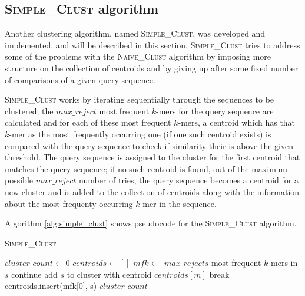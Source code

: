 

\subsection{\textsc{Simple\_Clust} algorithm}

Another clustering algorithm, named \textsc{Simple\_Clust}, was developed and
implemented, and will be described in this section. \textsc{Simple\_Clust}
tries to address some of the problems with the \textsc{Naive\_Clust} algorithm
by imposing more structure on the collection of centroids and by giving up
after some fixed number of comparisons of a given query sequence.


\textsc{Simple\_Clust} works by iterating sequentially through the sequences to
be clustered; the $max\_reject$ most frequent $k$-mers for the query sequence
are calculated and for each of these most frequent $k$-mers, a centroid which
has that $k$-mer as the most frequently occurring one (if one such centroid
exists) is compared with the query sequence to check if similarity their is
above the given threshold. The query sequence is assigned to the cluster for
the first centroid that matches the query sequence; if no such centroid is
found, out of the maximum possible $max\_reject$ number of tries, the query
sequence becomes a centroid for a new cluster and is added to the collection of
centroids along with the information about the most frequenty occurring $k$-mer
in the sequence.  %


Algorithm \ref{alg:simple_clust} shows pseudocode for the
\textsc{Simple\_Clust} algorithm.

\begin{algorithm}
  \caption{\textsc{Simple\_Clust}}
  \label{alg:simple_clust}
  \begin{algorithmic}[1]
    \Statex
      \State $cluster\_count \gets 0$
      \State $centroids \gets []$ 
        \State $mfk \gets$ $max\_rejects$ most frequent $k$-mers in $s$
            \State continue
            \State add $s$ to cluster with centroid $centroids[m]$
            \State break
          \EndIf
        \EndFor
          \State centroids.insert(mfk[0], s)
        \EndIf
      \EndFor
      \State \Return $cluster\_count$
    \EndFunction
  \end{algorithmic}
\end{algorithm}


